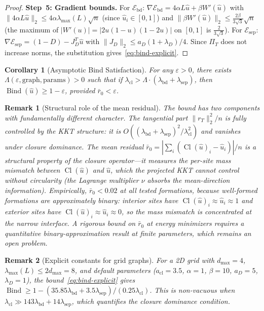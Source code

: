 \documentclass[lettersize,journal]{IEEEtran}
\newtheorem{corollary}[theorem]{Corollary}
\newtheorem{remark}{Remark}
\DeclareMathOperator{\Cl}{Cl}
\DeclareMathOperator{\Bind}{Bind}
\begin{document}
\begin{proof}
\textbf{Step~5: Gradient bounds.} For $\mathcal{E}_{\mathrm{bd}}$: $\nabla\mathcal{E}_{\mathrm{bd}} = 4\alpha L\hat{u} + \beta W'(\hat{u})$ with $\|4\alpha L\hat{u}\|_2 \leq 4\alpha\lambda_{\max}(L)\sqrt{n}$ (since $\hat{u}_i \in [0,1]$) and $\|\beta W'(\hat{u})\|_2 \leq \frac{2\beta}{3\sqrt{3}}\sqrt{n}$ (the maximum of $|W'(u)| = |2u(1-u)(1-2u)|$ on $[0,1]$ is $\frac{2}{3\sqrt{3}}$). For $\mathcal{E}_{\mathrm{sep}}$: $\nabla\mathcal{E}_{\mathrm{sep}} = (1 - D) - J_D^T \hat{u}$ with $\|J_D\|_2 \leq a_D(1+\lambda_D)/4$. Since $\Pi_T$ does not increase norms, the substitution gives~\eqref{eq:bind-explicit}.
\end{proof}

\begin{corollary}[Asymptotic Bind Satisfaction]
\label{cor:bind-asymptotic}
For any $\varepsilon > 0$, there exists $\Lambda(\varepsilon, \text{graph}, \text{params}) > 0$ such that if $\lambda_{\mathrm{cl}} > \Lambda \cdot (\lambda_{\mathrm{bd}} + \lambda_{\mathrm{sep}})$, then $\Bind(\hat{u}) \geq 1 - \varepsilon$, provided $\bar{r}_0 < \varepsilon$.
\end{corollary}

\begin{remark}[Structural role of the mean residual]
\label{rem:mean-residual}
The bound has two components with fundamentally different character. The tangential part $\|r_T\|_2^2/n$ is fully controlled by the KKT structure: it is $O((\lambda_{\mathrm{bd}} + \lambda_{\mathrm{sep}})^2/\lambda_{\mathrm{cl}}^2)$ and vanishes under closure dominance. The mean residual $\bar{r}_0 = |\sum_i(\Cl(\hat{u})_i - \hat{u}_i)|/n$ is a structural property of the closure operator---it measures the per-site mass mismatch between $\Cl(\hat{u})$ and $\hat{u}$, which the projected KKT cannot control without circularity (the Lagrange multiplier $\nu$ absorbs the mean-direction information). Empirically, $\bar{r}_0 < 0.02$ at all tested formations, because well-formed formations are approximately binary: interior sites have $\Cl(\hat{u})_i \approx \hat{u}_i \approx 1$ and exterior sites have $\Cl(\hat{u})_i \approx \hat{u}_i \approx 0$, so the mass mismatch is concentrated at the narrow interface. A rigorous bound on $\bar{r}_0$ at energy minimizers requires a quantitative binary-approximation result at finite parameters, which remains an open problem.
\end{remark}

\begin{remark}[Explicit constants for grid graphs]
For a 2D grid with $d_{\max} = 4$, $\lambda_{\max}(L) \leq 2d_{\max} = 8$, and default parameters ($a_{\mathrm{cl}} = 3.5$, $\alpha = 1$, $\beta = 10$, $a_D = 5$, $\lambda_D = 1$), the bound~\eqref{eq:bind-explicit} gives $\Bind \geq 1 - (35.85\lambda_{\mathrm{bd}} + 3.5\lambda_{\mathrm{sep}})/(0.25\lambda_{\mathrm{cl}})$. This is non-vacuous when $\lambda_{\mathrm{cl}} \gg 143\lambda_{\mathrm{bd}} + 14\lambda_{\mathrm{sep}}$, which quantifies the closure dominance condition.
\end{remark}
\end{document}
